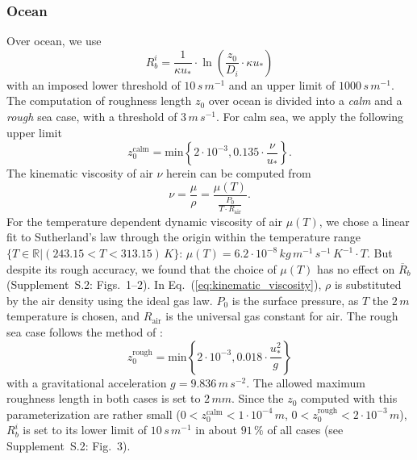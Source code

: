 \documentclass[gmd, manuscript]{copernicus}
\begin{document}
\subsubsection*{Ocean}
Over ocean, we use \citep[Eq.~(54),][]{ACP:Simpson2012}
\begin{equation}
  R_b^i = \frac{1}{\kappa u_*}\cdot\ln\left({\frac{z_0}{D_i}\cdot \kappa u_*}\right)
\end{equation}
with an imposed lower threshold of $10\,\unit{s\,m^{-1}}$ and an upper limit of $1000\,\unit{s\,m^{-1}}$. The computation of roughness length $z_0$ over ocean is divided into a \emph{calm} and a \emph{rough} sea case, with a threshold of $3\,\unit{m\,s^{-1}}$. For calm sea, we apply the following upper limit \citep[][with a slightly higher coefficient of $0.135$]{Hinze1975,Garratt1992}
\begin{equation}
  z_0^\text{calm} = \text{min}\left\{2\cdot10^{-3}, 0.135 \cdot \frac{\nu}{u_*}\right\}.
\end{equation}
The kinematic viscosity of air $\nu$ herein can be computed from 
\begin{equation}
  \nu = \frac{\mu}{\rho} = \frac{\mu(T)}{\frac{P_0}{T\cdot R_\text{air}}}.
  \label{eq:kinematic_viscosity}
\end{equation}
For the temperature dependent dynamic viscosity of air $\mu(T)$, we chose a linear fit to Sutherland's law through the origin within the temperature range $\{T \in \mathbb{R} | (243.15 < T < 313.15)\,\unit{K}\}$: $\mu(T) = 6.2\cdot 10^{-8}\,\unit{kg\,m^{-1}\,s^{-1}\,K^{-1}} \cdot T$. But despite its rough accuracy, we found that the choice of $\mu(T)$ has no effect on $\overline{R}_b$ (Supplement~S.2: Figs.~1--2). In Eq.~(\ref{eq:kinematic_viscosity}), $\rho$ is substituted by the air density using the ideal gas law. $P_0$ is the surface pressure, as $T$ the $2\,\unit{m}$ temperature is chosen, and $R_\text{air}$ is the universal gas constant for air.
The rough sea case follows the method of \citet{QJRMS:Charnock1955,JPO:Wu1980}:
\begin{equation}
  z_0^\text{rough} = \text{min}\left\{2\cdot10^{-3}, 0.018 \cdot \frac{u^2_*}{g}\right\}
\end{equation}
with a gravitational acceleration $g = 9.836\,\unit{m\,s^{-2}}$. The allowed maximum roughness length in both cases is set to $2\,\unit{mm}$. Since the $z_0$ computed with this parameterization are rather small ($0 < z_0^\text{calm} < 1\cdot 10^{-4}\,\unit{m}$, $0 < z_0^\text{rough} < 2 \cdot 10^{-3}\,\unit{m}$), $R^i_b$ is set to its lower limit of $10\,\unit{s\,m^{-1}}$ in about $91\,\unit{\%}$ of all cases (see Supplement~S.2: Fig.~3). 
\end{document}
